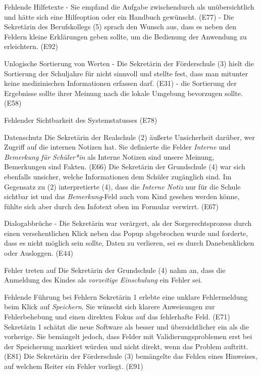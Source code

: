 Fehlende Hilfetexte
- Sie empfand die Aufgabe zwischendurch als unübersichtlich und hätte sich eine Hilfeoption oder ein Handbuch gewünscht. (E77)
- Die Sekretärin des Berufskollegs (5) sprach den Wunsch aus, dass es neben den Feldern kleine Erklärungen geben sollte, um die Bedienung der Anwendung zu erleichtern. (E92)


Unlogische Sortierung von Werten
- Die Sekretärin der Förderschule (3) hielt die Sortierung der Schuljahre für nicht sinnvoll und stellte fest, dass man mitunter keine medizinischen Informationen erfassen darf. (E31)
- die Sortierung der Ergebnisse sollte ihrer Meinung nach die lokale Umgebung bevorzugen sollte. (E58)

Fehlender Sichtbarkeit des Systemstatusses
(E78)

Datenschutz
Die Sekretärin der Realschule (2) äußerte Unsicherheit darüber, wer Zugriff auf die internen Notizen hat. Sie definierte die Felder \textit{Interne} und \textit{Bemerkung für Schüler*in} als \glqq Interne Notizen sind unsere Meinung, Bemerkungen sind Fakten\grqq{}. (E66) Die Sekretärin der Grundschule (4) war sich ebenfalls unsicher, welche Informationen dem Schüler zugänglich sind. Im Gegensatz zu (2) interpretierte (4), dass die \textit{Interne Notiz} nur für die Schule sichtbar ist und das \textit{Bemerkung}-Feld auch vom Kind gesehen werden könne, fühlte sich aber durch den Infotext oben im Formular verwirrt. (E67)

Dialogabbrüche
- Die Sekretärin war verärgert, als der Sorgerechtsprozess durch einen versehentlichen Klick neben das Popup abgebrochen wurde und forderte, dass es nicht möglich sein sollte, Daten zu verlieren, sei es durch Danebenklicken oder Ausloggen. (E44)

Fehler treten auf
Die Sekretärin der Grundschule (4) nahm an, dass die Anmeldung des Kindes als \textit{vorzeitige Einschulung} ein Fehler sei. 

Fehlende Führung bei Fehlern
Sekretärin 1 erlebte eine unklare Fehlermeldung beim Klick auf \textit{Speichern}. Sie wünscht sich klarere Anweisungen zur Fehlerbehebung und einen direkten Fokus auf das fehlerhafte Feld. (E71)
Sekretärin 1 schätzt die neue Software als besser und übersichtlicher ein als die vorherige. Sie bemängelt jedoch, dass Felder mit Validierungsproblemen erst bei der Speicherung markiert würden und nicht direkt, wenn das Problem auftritt. (E81)
Die Sekretärin der Förderschule (3) bemängelte das Fehlen eines Hinweises, auf welchem Reiter ein Fehler vorliegt. (E91)

